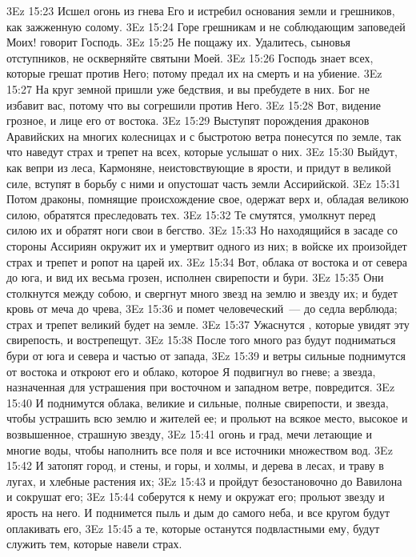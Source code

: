 \vs 3Ez 15:23 Исшел огонь из гнева Его и истребил основания земли и грешников, как зажженную солому.
\vs 3Ez 15:24 Горе грешникам и не соблюдающим заповедей Моих! говорит Господь.
\vs 3Ez 15:25 Не пощажу их. Удалитесь, сыновья отступников, не оскверняйте святыни Моей.
\vs 3Ez 15:26 Господь знает всех, которые грешат против Него; потому предал их на смерть и на убиение.
\vs 3Ez 15:27 На круг земной пришли уже бедствия, и вы пребудете в них. Бог не избавит вас, потому что вы согрешили против Него.
\vs 3Ez 15:28 Вот, видение грозное, и лице его от востока.
\vs 3Ez 15:29 Выступят порождения драконов Аравийских на многих колесницах и с быстротою ветра понесутся по земле, так что наведут страх и трепет на всех, которые услышат о них.
\vs 3Ez 15:30 Выйдут, как вепри из леса, Кармоняне, неистовствующие в ярости, и придут в великой силе, вступят в борьбу с ними и опустошат часть земли Ассирийской.
\vs 3Ez 15:31 Потом драконы, помнящие происхождение свое, одержат верх и, обладая великою силою, обратятся преследовать тех.
\vs 3Ez 15:32 Те смутятся, умолкнут перед силою их и обратят ноги свои в бегство.
\vs 3Ez 15:33 Но находящийся в засаде со стороны Ассириян окружит их и умертвит одного из них; в войске их произойдет страх и трепет и ропот на царей их.
\vs 3Ez 15:34 Вот, облака от востока и от севера до юга, и вид их весьма грозен, исполнен свирепости и бури.
\vs 3Ez 15:35 Они столкнутся между собою, и свергнут много звезд на землю и звезду их; и будет кровь от меча до чрева,
\vs 3Ez 15:36 и помет человеческий~--- до седла верблюда; страх и трепет великий будет на земле.
\vs 3Ez 15:37 Ужаснутся , которые увидят эту свирепость, и вострепещут.
\vs 3Ez 15:38 После того много раз будут подниматься бури от юга и севера и частью от запада,
\vs 3Ez 15:39 и ветры сильные поднимутся от востока и откроют его и облако, которое Я подвигнул во гневе; а звезда, назначенная для устрашения при восточном и западном ветре, повредится.
\vs 3Ez 15:40 И поднимутся облака, великие и сильные, полные свирепости, и звезда, чтобы устрашить всю землю и жителей ее; и прольют на всякое место, высокое и возвышенное, страшную звезду,
\vs 3Ez 15:41 огонь и град, мечи летающие и многие воды, чтобы наполнить все поля и все источники множеством вод.
\vs 3Ez 15:42 И затопят город, и стены, и горы, и холмы, и дерева в лесах, и траву в лугах, и хлебные растения их;
\vs 3Ez 15:43 и пройдут безостановочно до Вавилона и сокрушат его;
\vs 3Ez 15:44 соберутся к нему и окружат его; прольют звезду и ярость на него. И поднимется пыль и дым до самого неба, и все кругом будут оплакивать его,
\vs 3Ez 15:45 а те, которые останутся подвластными ему, будут служить тем, которые навели страх.
